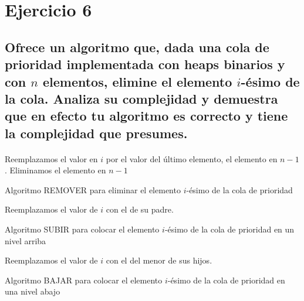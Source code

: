 \documentclass[12pt]{article}
\begin{document}
 \section{Ejercicio 6}
 \subsection{Ofrece un algoritmo que, dada una cola de prioridad implementada con heaps binarios y con $n$ elementos, elimine el elemento $i$-ésimo de la cola. Analiza su complejidad y demuestra que en efecto tu algoritmo es correcto y tiene la complejidad que presumes.}
 \paragraph{} 
 \begin{algorithm}[H]
 	\SetAlgoLined
		Reemplazamos el valor en $i$ por el valor del último elemento, el elemento en $n-1$.\;
		Eliminamos el elemento en $n-1$
 	\caption{Algoritmo REMOVER para eliminar el elemento $i$-ésimo de la cola de prioridad}
 \end{algorithm}
\begin{algorithm}[H]
	\SetAlgoLined
	Reemplazamos el valor de $i$ con el de su padre.\;
	\caption{Algoritmo SUBIR para colocar el elemento $i$-ésimo de la cola de prioridad en un nivel arriba}
\end{algorithm}
\begin{algorithm}[H]
	\SetAlgoLined
	Reemplazamos el valor de $i$ con el del menor de sus hijos.\;
	\caption{Algoritmo BAJAR para colocar el elemento $i$-ésimo de la cola de prioridad en una nivel abajo}
\end{algorithm}
\end{document}

